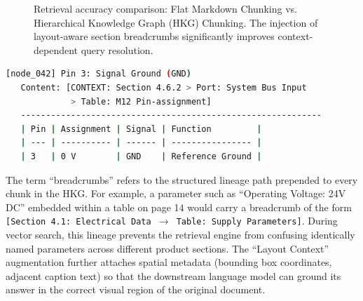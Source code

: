 \begin{figure}[htbp]
\centering
{}
\caption{Retrieval accuracy comparison: Flat Markdown Chunking vs. Hierarchical Knowledge Graph (HKG) Chunking. The injection of layout-aware section breadcrumbs significantly improves context-dependent query resolution.}
\label{fig:retrieval_comparison}
\end{figure}

\begin{lstlisting}[language=bash, caption={Hierarchical Knowledge Graph (HKG) node embedding structural breadcrumbs showing lineage preservation for context-aware retrieval.}, label={lst:hkg_breadcrumb}]
[node_042] Pin 3: Signal Ground (GND)
   Content: [CONTEXT: Section 4.6.2 > Port: System Bus Input 
             > Table: M12 Pin-assignment]
   ------------------------------------------------------------
   | Pin | Assignment | Signal | Function         |
   | --- | ---------- | ------ | ---------------- |
   | 3   | 0 V        | GND    | Reference Ground |
\end{lstlisting}

The term ``breadcrumbs'' refers to the structured lineage path prepended to every chunk in the HKG. For example, a parameter such as ``Operating Voltage: 24V DC'' embedded within a table on page 14 would carry a breadcrumb of the form \texttt{[Section 4.1: Electrical Data $\rightarrow$ Table: Supply Parameters]}. During vector search, this lineage prevents the retrieval engine from confusing identically named parameters across different product sections. The ``Layout Context'' augmentation further attaches spatial metadata (bounding box coordinates, adjacent caption text) so that the downstream language model can ground its answer in the correct visual region of the original document.

